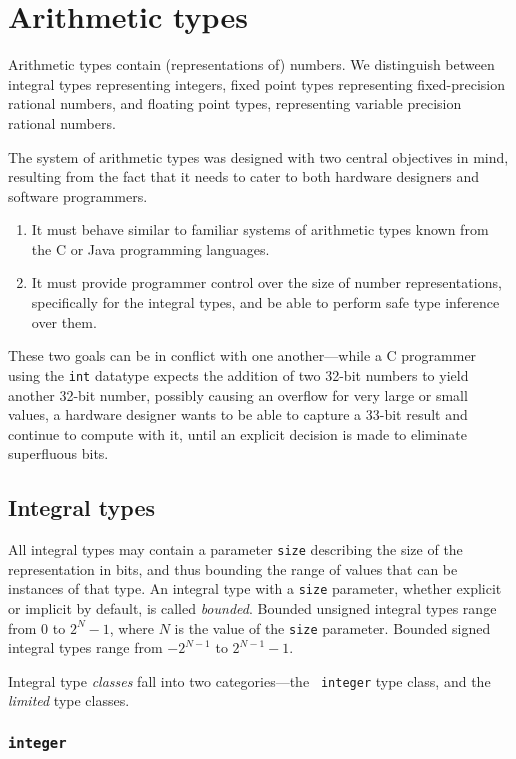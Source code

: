 \section{Arithmetic types}

Arithmetic types contain (representations of) numbers. We distinguish
between integral types representing integers,
fixed point types representing fixed-precision rational numbers, and
floating point types, representing variable precision rational
numbers.

The system of arithmetic types was designed with two central
objectives in mind, resulting from the fact that it needs to cater to
both hardware designers and software programmers.
\begin{enumerate}
\item It must behave similar to familiar systems of arithmetic types
  known from the C or Java programming languages.
\item It must provide programmer control over the size of number
  representations, specifically for the integral types, and be able to
  perform safe type inference over them.
\end{enumerate}
These two goals can be in conflict with one another---while a C
programmer using the {\tt int} datatype expects the addition of two
32-bit numbers to yield another 32-bit number, possibly causing an
overflow for very large or small values, a hardware designer wants to
be able to capture a 33-bit result and continue to compute with it,
until an explicit decision is made to eliminate superfluous bits.

\subsection{Integral types}

All integral types may contain a parameter {\tt size} describing the
size of the representation in bits, and thus bounding the range of
values that can be instances of that type. An integral type with a
{\tt size} parameter, whether explicit or implicit by default, is
called {\em bounded}. Bounded unsigned integral types range from 0 to
$2^N-1$, where $N$ is the value of the {\tt size} parameter. Bounded
signed integral types range from $-2^{N-1}$ to $2^{N-1}-1$.

Integral type {\em classes} fall into two categories---the {\tt
  integer} type class, and the {\em limited} type classes.

\subsubsection{\tt integer}

